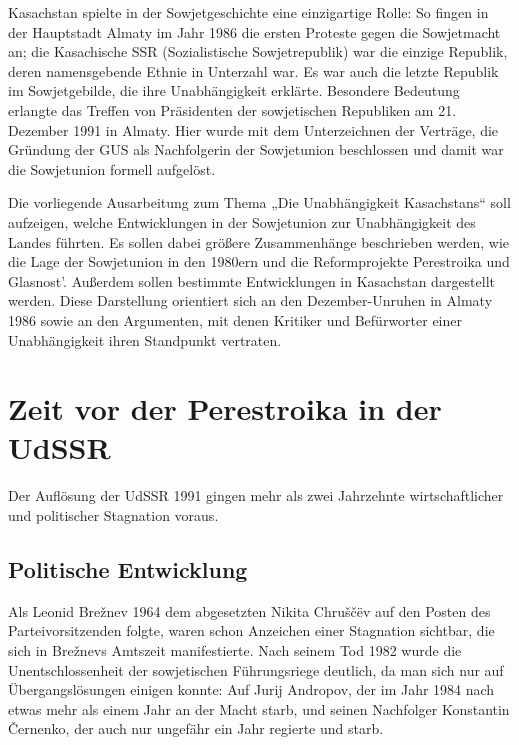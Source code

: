 \documentclass[12pt,headsepline,a4paper]{scrartcl}
\begin{document}
Kasachstan spielte in der Sowjetgeschichte eine einzigartige Rolle: So
fingen in der Hauptstadt Almaty im Jahr 1986 die ersten Proteste gegen die
Sowjetmacht an; die Kasachische SSR (Sozialistische Sowjetrepublik) war die einzige
Republik, deren namensgebende Ethnie in Unterzahl war. Es war auch die letzte
Republik im Sowjetgebilde, die ihre Unabhängigkeit erklärte. Besondere Bedeutung
erlangte das Treffen von Präsidenten der sowjetischen Republiken am 21. Dezember
1991 in Almaty. Hier wurde mit dem Unterzeichnen der Verträge, die Gründung der
GUS als Nachfolgerin der Sowjetunion beschlossen und damit war die Sowjetunion
formell aufgelöst.

Die vorliegende Ausarbeitung zum Thema „Die Unabhängigkeit Kasachstans“ soll
aufzeigen, welche Entwicklungen in der Sowjetunion zur Unabhängigkeit des Landes
führten. Es sollen dabei größere Zusammenhänge beschrieben werden, wie die Lage der
Sowjetunion in den 1980ern und die Reformprojekte Perestroika und Glasnost'.
Außerdem sollen bestimmte Entwicklungen in Kasachstan dargestellt werden. Diese
Darstellung orientiert sich an den Dezember-Unruhen in Almaty 1986 sowie an den
Argumenten, mit denen Kritiker und Befürworter einer Unabhängigkeit ihren
Standpunkt vertraten.
\newpage

\section{Zeit vor der Perestroika in der UdSSR}
Der Auflösung der UdSSR 1991 gingen mehr als zwei Jahrzehnte wirtschaftlicher
und politischer Stagnation voraus.
\subsection{Politische Entwicklung}
Als Leonid Brežnev 1964 dem abgesetzten Nikita Chruščëv auf den Posten des
Parteivorsitzenden folgte, waren schon Anzeichen einer Stagnation sichtbar, die sich in
Brežnevs Amtszeit manifestierte. Nach seinem Tod 1982 wurde die Unentschlossenheit
der sowjetischen Führungsriege deutlich, da man sich nur auf Übergangslösungen
einigen konnte: Auf Jurij Andropov, der im Jahr 1984 nach etwas mehr als einem Jahr an der
Macht starb, und seinen Nachfolger Konstantin Černenko, der auch nur ungefähr ein
Jahr regierte und starb.
\end{document}
